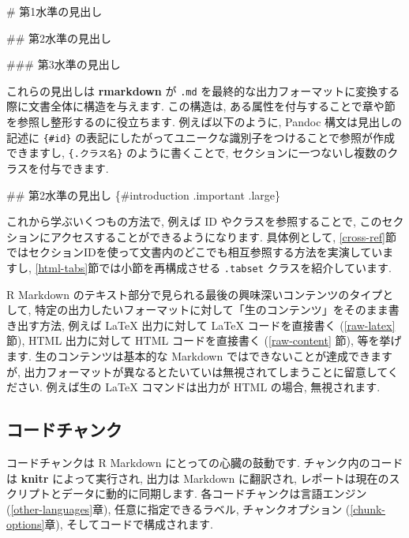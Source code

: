 \documentclass[
  11pt,
  lualatex,ja=standard,jafont=noto]{bxjsreport}
\newenvironment{Shaded}{\begin{snugshade}}{\end{snugshade}}
\newcommand{\FunctionTok}[1]{\textcolor[rgb]{0.00,0.00,0.00}{#1}}
\begin{document}
\begin{Shaded}
\begin{Highlighting}[]
\FunctionTok{\# 第1水準の見出し}

\FunctionTok{\#\# 第2水準の見出し}

\FunctionTok{\#\#\# 第3水準の見出し}
\end{Highlighting}
\end{Shaded}

これらの見出しは \textbf{rmarkdown} が \texttt{.md} を最終的な出力フォーマットに変換する際に文書全体に構造を与えます. この構造は, ある属性を付与することで章や節を参照し整形するのに役立ちます. 例えば以下のように, Pandoc 構文は見出しの記述に \texttt{\{\#id\}} の表記にしたがってユニークな識別子をつけることで参照が作成できますし, \texttt{\{.クラス名\}} のように書くことで, セクションに一つないし複数のクラスを付与できます.

\begin{Shaded}
\begin{Highlighting}[]
\FunctionTok{\#\# 第2水準の見出し \{\#introduction .important .large\}}
\end{Highlighting}
\end{Shaded}

これから学ぶいくつもの方法で, 例えば ID やクラスを参照することで, このセクションにアクセスすることができるようになります. 具体例として, \ref{cross-ref}節ではセクションIDを使って文書内のどこでも相互参照する方法を実演していますし, \ref{html-tabs}節では小節を再構成させる \texttt{.tabset} クラスを紹介しています.

R Markdown のテキスト部分で見られる最後の興味深いコンテンツのタイプとして, 特定の出力したいフォーマットに対して「生のコンテンツ」をそのまま書き出す方法, 例えば LaTeX 出力に対して LaTeX コードを直接書く (\ref{raw-latex} 節), HTML 出力に対して HTML コードを直接書く (\ref{raw-content} 節), 等を挙げます. 生のコンテンツは基本的な Markdown ではできないことが達成できますが, 出力フォーマットが異なるとたいていは無視されてしまうことに留意してください. 例えば生の LaTeX コマンドは出力が HTML の場合, 無視されます.

\hypertarget{code-chunks}{%
\subsection{コードチャンク}\label{code-chunks}}

コードチャンクは R Markdown にとっての心臓の鼓動です. チャンク内のコードは \textbf{knitr} によって実行され, 出力は Markdown に翻訳され, レポートは現在のスクリプトとデータに動的に同期します. 各コードチャンクは言語エンジン (\ref{other-languages}章), 任意に指定できるラベル, チャンクオプション (\ref{chunk-options}章), そしてコードで構成されます.
\end{document}
